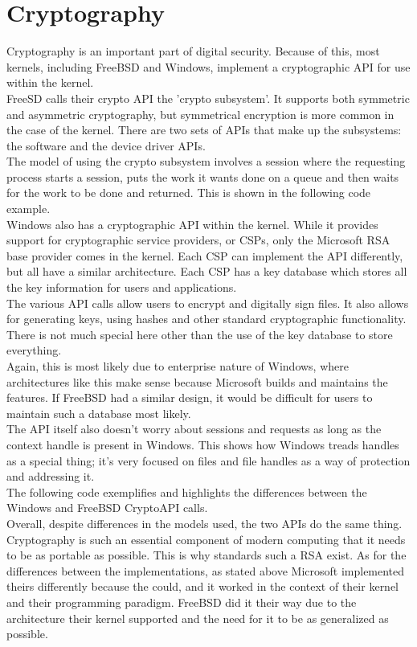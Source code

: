 \documentclass[titlepage]{article}
\begin{document}
\section{Cryptography}
\begin{singlespace}
    Cryptography is an important part of digital security. Because of this, most kernels, including FreeBSD and Windows, implement a cryptographic API for use within the kernel.\\
    FreeSD calls their crypto API the 'crypto subsystem'. It supports both symmetric and asymmetric cryptography, but symmetrical encryption is more common in the case of the kernel. There are two sets of APIs that make up the subsystems: the software and the device driver APIs. \cite{freebsdch5}\\
    The model of using the crypto subsystem involves a session where the requesting process starts a session, puts the work it wants done on a queue and then waits for the work to be done and returned. This is shown in the following code example. \\

    Windows also has a cryptographic API within the kernel. While it provides support for cryptographic service providers, or CSPs, only the Microsoft RSA base provider comes in the kernel. Each CSP can implement the API differently, but all have a similar architecture. Each CSP has a key database which stores all the key information for users and applications. \\
    The various API calls allow users to encrypt and digitally sign files. It also allows for generating keys, using hashes and other standard cryptographic functionality. There is not much special here other than the use of the key database to store everything.\cite{msdn}\\
    Again, this is most likely due to enterprise nature of Windows, where architectures like this make sense because Microsoft builds and maintains the features. If FreeBSD had a similar design, it would be difficult for users to maintain such a database most likely. \\
    The API itself also doesn't worry about sessions and requests as long as the context handle is present in Windows. This shows how Windows treads handles as a special thing; it's very focused on files and file handles as a way of protection and addressing it.\\
    The following code exemplifies and highlights the differences between the Windows and FreeBSD CryptoAPI calls.\\ 

    Overall, despite differences in the models used, the two APIs do the same thing. Cryptography is such an essential component of modern computing that it needs to be as portable as possible. This is why standards such a RSA exist. As for the differences between the implementations, as stated above Microsoft implemented theirs differently because the could, and it worked in the context of their kernel and their programming paradigm. FreeBSD did it their way due to the architecture their kernel supported and the need for it to be as generalized as possible. \\
\end{singlespace}

\newpage


\end{document}
